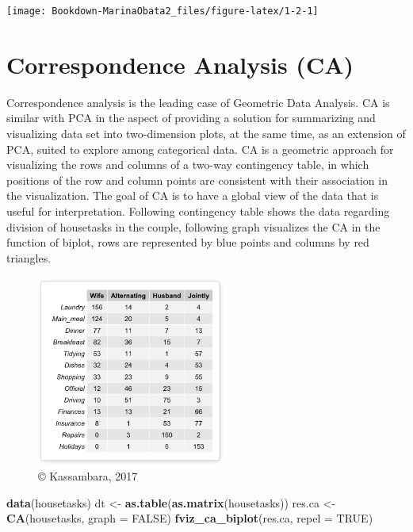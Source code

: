 \documentclass[]{book}
\newenvironment{Shaded}{\begin{snugshade}}{\end{snugshade}}
\newcommand{\DataTypeTok}[1]{\textcolor[rgb]{0.13,0.29,0.53}{#1}}
\newcommand{\KeywordTok}[1]{\textcolor[rgb]{0.13,0.29,0.53}{\textbf{#1}}}
\newcommand{\NormalTok}[1]{#1}
\newcommand{\OtherTok}[1]{\textcolor[rgb]{0.56,0.35,0.01}{#1}}
\newcommand{\StringTok}[1]{\textcolor[rgb]{0.31,0.60,0.02}{#1}}
\begin{document}
\texttt{[image: Bookdown-MarinaObata2\_files/figure-latex/1-2-1]}

\hypertarget{correspondence-analysis-ca}{%
\section{Correspondence Analysis (CA)}\label{correspondence-analysis-ca}}

Correspondence analysis is the leading case of Geometric Data Analysis. CA is similar with PCA in the aspect of providing a solution for summarizing and visualizing data set into two-dimension plots, at the same time, as an extension of PCA, suited to explore among categorical data. CA is a geometric approach for visualizing the rows and columns of a two-way contingency table, in which positions of the row and column points are consistent with their association in the visualization. The goal of CA is to have a global view of the data that is useful for interpretation.
Following contingency table shows the data regarding division of housetasks in the couple, following graph visualizes the CA in the function of biplot, rows are represented by blue points and columns by red triangles.

\begin{figure}
\centering
\includegraphics[width=0.55\textwidth,height=\textheight]{housework.png}
\caption{© Kassambara, 2017}
\end{figure}

\begin{Shaded}
\begin{Highlighting}[]
\KeywordTok{data}\NormalTok{(housetasks)}
\NormalTok{dt <-}\StringTok{ }\KeywordTok{as.table}\NormalTok{(}\KeywordTok{as.matrix}\NormalTok{(housetasks))}
\NormalTok{res.ca <-}\StringTok{ }\KeywordTok{CA}\NormalTok{(housetasks, }\DataTypeTok{graph =} \OtherTok{FALSE}\NormalTok{)}
\KeywordTok{fviz_ca_biplot}\NormalTok{(res.ca, }\DataTypeTok{repel =} \OtherTok{TRUE}\NormalTok{)}
\end{Highlighting}
\end{Shaded}
\end{document}
